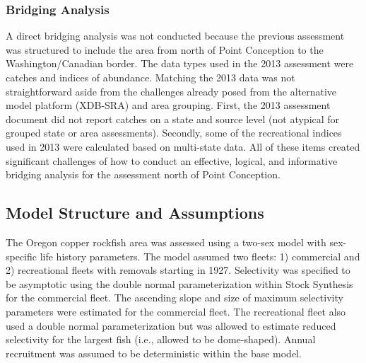 \documentclass[11pt,
  english,
  a4paper,
]{article}
\begin{document}
\leavevmode\tagmcend\tagstructend\par


\hypertarget{bridging-analysis}{%
\subsubsection{Bridging Analysis}\label{bridging-analysis}}

\leavevmode\tagmcend\tagstructend


A direct bridging analysis was not conducted because the previous assessment was structured to include the area from north of Point Conception to the Washington/Canadian border. The data types used in the 2013 assessment were catches and indices of abundance. Matching the 2013 data was not straightforward aside from the challenges already posed from the alternative model platform (XDB-SRA) and area grouping. First, the 2013 assessment document did not report catches on a state and source level (not atypical for grouped state or area assessments). Secondly, some of the recreational indices used in 2013 were calculated based on multi-state data. All of these items created significant challenges of how to conduct an effective, logical, and informative bridging analysis for the assessment north of Point Conception.

\leavevmode\tagmcend\tagstructend\par


\hypertarget{model-structure-and-assumptions}{%
\subsection{Model Structure and Assumptions}\label{model-structure-and-assumptions}}

\leavevmode\tagmcend\tagstructend


The Oregon copper rockfish area was assessed using a two-sex model with sex-specific life history parameters. The model assumed two fleets: 1) commercial and 2) recreational fleets with removals starting in 1927. Selectivity was specified to be asymptotic using the double normal parameterization within Stock Synthesis for the commercial fleet. The ascending slope and size of maximum selectivity parameters were estimated for the commercial fleet. The recreational fleet also used a double normal parameterization but was allowed to estimate reduced selectivity for the largest fish (i.e., allowed to be dome-shaped). Annual recruitment was assumed to be deterministic within the base model.
\end{document}
